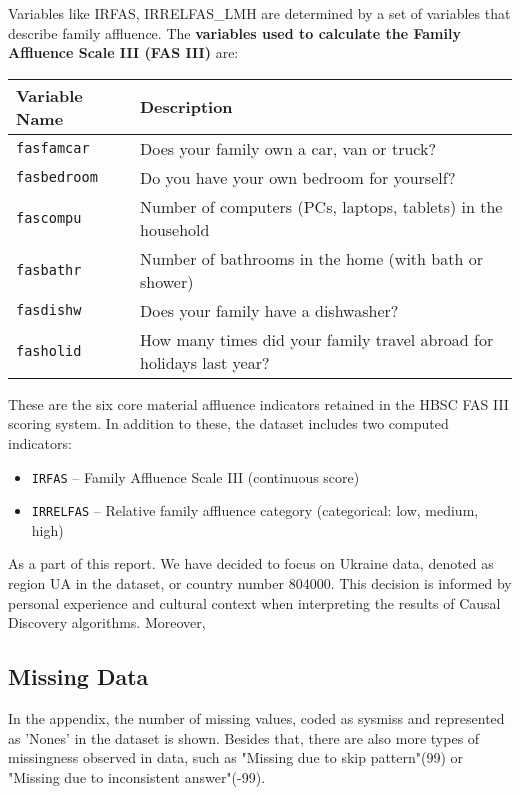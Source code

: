 \documentclass[main.tex]{subfiles}
\begin{document}
Variables like IRFAS, IRRELFAS\_LMH are determined by a set of variables that describe family affluence. The \textbf{variables used to calculate the Family Affluence Scale III (FAS III)}  are:

\begin{longtable}{@{}ll@{}}
\toprule
\textbf{Variable Name} & \textbf{Description} \\
\midrule
\texttt{fasfamcar} & Does your family own a car, van or truck? \\
\texttt{fasbedroom} & Do you have your own bedroom for yourself? \\
\texttt{fascompu} & Number of computers (PCs, laptops, tablets) in the household \\
\texttt{fasbathr} & Number of bathrooms in the home (with bath or shower) \\
\texttt{fasdishw} & Does your family have a dishwasher? \\
\texttt{fasholid} & How many times did your family travel abroad for holidays last year? \\
\bottomrule
\end{longtable}

These are the six core material affluence indicators retained in the HBSC FAS III scoring system. In addition to these, the dataset includes two computed indicators:
\begin{itemize}
 \item \texttt{IRFAS} – Family Affluence Scale III (continuous score)
 \item \texttt{IRRELFAS} – Relative family affluence category (categorical: low, medium, high)
\end{itemize}
 


As a part of this report. We have decided to focus on Ukraine data, denoted as region UA in the dataset, or country number 804000. This decision is informed by personal experience and cultural context when interpreting the results of Causal Discovery algorithms. Moreover, 

% 

\subsection{Missing Data}
In the appendix, the number of missing values, coded as sysmiss and represented as 'Nones' in the dataset is shown. Besides that, there are also more types of missingness observed in data, such as "Missing due to skip pattern"(99) or "Missing due to inconsistent answer"(-99).
\end{document}
